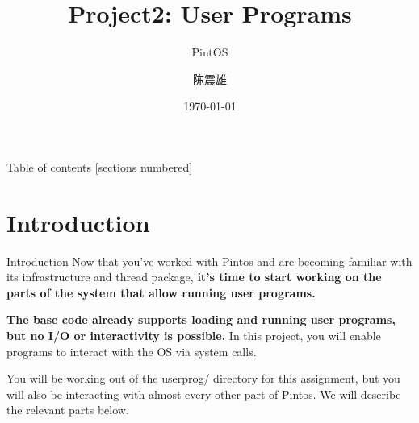 \documentclass[10pt]{beamer}
\title{Project2: User Programs}
\subtitle{PintOS}
\date{\today}
\author{陈震雄}
\institute{武汉大学}
\begin{document}
\maketitle

\begin{frame}{Table of contents}
  [sections numbered]
  \tableofcontents[hideallsubsections]
\end{frame}

\section{Introduction}
\begin{frame}{Introduction}
    Now that you've worked with Pintos and are becoming familiar with its infrastructure and thread package, \textbf{it's time to start working on the parts of the system that allow running user programs.}

\textbf{The base code already supports loading and running user programs, but no I/O or interactivity is possible.} In this project, you will enable programs to interact with the OS via system calls.

You will be working out of the userprog/ directory for this assignment, but you will also be interacting with almost every other part of Pintos. We will describe the relevant parts below.
\end{frame}
\end{document}
